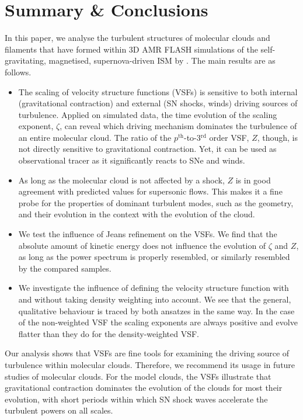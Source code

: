 \section{Summary \& Conclusions}\label{conclusions}

In this paper, we analyse the turbulent structures of molecular clouds and filaments that have formed within 3D AMR FLASH simulations of the self-gravitating, magnetised, supernova-driven ISM by \citet{IbanezMejia2016}.
The main results are as follows.

\begin{itemize}
	\item The scaling of velocity structure functions (VSFs) is sensitive to both internal (gravitational contraction) and external (SN shocks, winds) driving sources of turbulence. Applied on simulated data, the time evolution of the scaling exponent, $\zeta$, can reveal which driving mechanism dominates the turbulence of an entire molecular cloud. The ratio of the $p^\mathrm{th}$-to-3$^\mathrm{rd}$ order VSF, $Z$, though, is not directly sensitive to gravitational contraction. Yet, it can be used as observational tracer as it significantly reacts to SNe and winds.
	\item As long as the molecular cloud is not affected by a shock, $Z$ is in good agreement with predicted values for supersonic flows. This makes it a fine probe for the properties of dominant turbulent modes, such as the geometry, and their evolution in the context with the evolution of the cloud. 
	\item We test the influence of Jeans refinement on the VSFs. We find that the absolute amount of kinetic energy does not influence the evolution of $\zeta$ and $Z$, as long as the power spectrum is properly resembled, or similarly resembled by the compared samples.
    \item We investigate the influence of defining the velocity structure function with and without taking density weighting into account. We see that the general, qualitative behaviour is traced by both ansatzes in the same way. In the case of the non-weighted VSF the scaling exponents are always positive and evolve flatter than they do for the density-weighted VSF.
\end{itemize}

Our analysis shows that VSFs are fine tools for examining the driving source of turbulence within molecular clouds.
Therefore, we recommend its usage in future studies of molecular clouds.
For the model clouds, the VSFs illustrate that gravitational contraction dominates the evolution of the clouds for most their evolution, with short periods within which SN shock waves accelerate the turbulent powers on all scales. 

